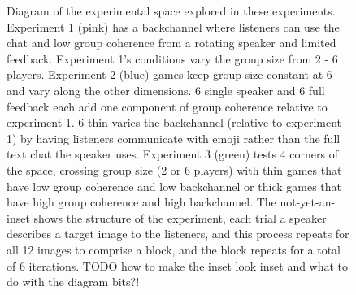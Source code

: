 \documentclass[
  english,
  a4paper,
]{article}
\begin{document}
\begin{figure}
    
\caption{ Diagram of the experimental space explored in these experiments. Experiment 1 (pink) has a backchannel where listeners can use the chat and low group coherence from a rotating speaker and limited feedback. Experiment 1's conditions vary the group size from 2 - 6 players. Experiment 2 (blue) games keep group size constant at 6 and vary along the other dimensions. 6 single speaker and 6 full feedback each add one component of group coherence relative to experiment 1. 6 thin varies the backchannel (relative to experiment 1) by having listeners communicate with emoji rather than the full text chat the speaker uses. Experiment 3 (green) tests 4 corners of the space, crossing group size (2 or 6 players) with thin games that have low group coherence and low backchannel or thick games that have high group coherence and high backchannel.  The not-yet-an-inset shows the structure of the experiment, each trial a speaker describes a target image to the listeners, and this process repeats for all 12 images to comprise a block, and the block repeats for a total of 6 iterations. TODO how to make the inset look inset and what to do with the diagram bits?! }
    \label{diagram}
\end{figure}
\end{document}
